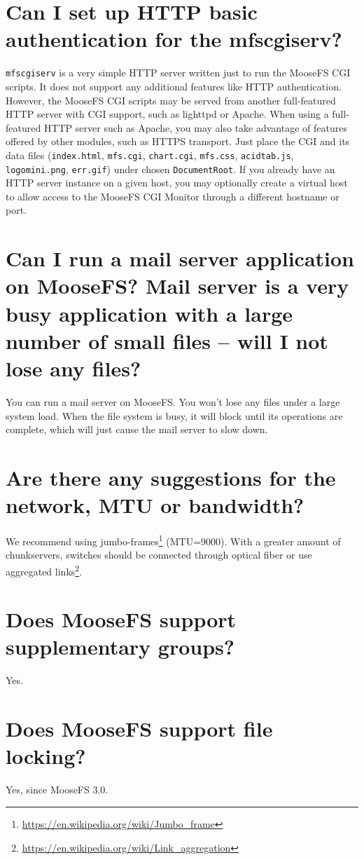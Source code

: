 \documentclass[a4paper,11pt,english]{report}
\def\code#1{\texttt{#1}}
\begin{document}
		\section{Can I set up HTTP basic authentication for the mfscgiserv?}
		\code{mfscgiserv} is a very simple HTTP server written just to run the MooseFS CGI scripts. It does not support any additional features like HTTP authentication. However, the MooseFS CGI scripts may be served from another full-featured HTTP server with CGI support, such as lighttpd or Apache. When using a full-featured HTTP server such as Apache, you may also take advantage of features offered by other modules, such as HTTPS transport. Just place the CGI and its data files (\code{index.html}, \code{mfs.cgi}, \code{chart.cgi}, \code{mfs.css}, \code{acidtab.js}, \code{logomini.png}, \code{err.gif}) under chosen \code{DocumentRoot}. If you already have an HTTP server instance on a given host, you may optionally create a virtual host to allow access to the MooseFS CGI Monitor through a different hostname or port.  
		
		
		\section{Can I run a mail server application on MooseFS? Mail server is a very busy application with a large number of small files -- will I not lose any files?}
		You can run a mail server on MooseFS. You won't lose any files under a large system load. When the file system is busy, it will block until its operations are complete, which will just cause the mail server to slow down. 
		 
		 
		\section{Are there any suggestions for the network, MTU or bandwidth?}
		We recommend using jumbo-frames\footnote{\url{https://en.wikipedia.org/wiki/Jumbo_frame}} (MTU=9000). With a greater amount of chunkservers, switches should be connected through optical fiber or use aggregated links\footnote{\url{https://en.wikipedia.org/wiki/Link_aggregation}}.		
		
		\section{Does MooseFS support supplementary groups?}
		Yes.
		 
		\section{Does MooseFS support file locking?}
		Yes, since MooseFS 3.0.
		
\end{document}
